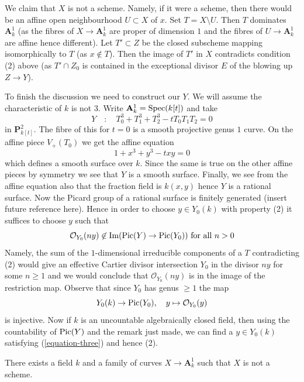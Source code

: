 \medskip\noindent
We claim that $X$ is not a scheme. Namely, if it were a scheme,
then there would be an affine open neighbourhood $U \subset X$ of $x$.
Set $T = X \setminus U$. Then $T$ dominates $\mathbf{A}^1_k$
(as the fibres of $X \to \mathbf{A}^1_k$ are proper of dimension $1$
and the fibres of $U \to \mathbf{A}^1_k$ are affine hence different).
Let $T' \subset Z$ be the closed subscheme mapping isomorphically
to $T$ (as $x \not \in T$). Then the image of $T'$ in $X$
contradicts condition (2) above (as $T' \cap Z_0$ is contained in
the exceptional divisor $E$ of the blowing up $Z \to Y$).

\medskip\noindent
To finish the discussion we need to construct our $Y$.
We will assume the characteristic of $k$ is not $3$.
Write $\mathbf{A}^1_k = \mathop{\mathrm{Spec}}(k[t])$ and take
$$
Y \quad : \quad T_0^3 + T_1^3 + T_2^3 - tT_0T_1T_2 = 0
$$
in $\mathbf{P}^2_{k[t]}$. The fibre of this for $t = 0$
is a smooth projective genus $1$ curve. On the affine piece
$V_+(T_0)$ we get the affine equation
$$
1 + x^3 + y^3 - txy = 0
$$
which defines a smooth surface over $k$. Since the same is true on the other
affine pieces by symmetry we see that $Y$ is a smooth surface.
Finally, we see from the affine equation also that the fraction
field is $k(x, y)$ hence $Y$ is a rational surface.
Now the Picard group of a rational surface is finitely generated
(insert future reference here).
Hence in order to choose $y \in Y_0(k)$ with property (2)
it suffices to choose $y$ such that
\begin{equation}
\label{equation-three}
\mathcal{O}_{Y_0}(ny) \not \in \mathop{\mathrm{Im}}(\mathop{\mathrm{Pic}}\nolimits(Y) \to \mathop{\mathrm{Pic}}\nolimits(Y_0))
\text{ for all }n > 0
\end{equation}
Namely, the sum of the $1$-dimensional irreducible components of a $T$
contradicting (2) would give an effective Cartier divisor intersection $Y_0$
in the divisor $ny$ for some $n \geq 1$ and we would conclude
that $\mathcal{O}_{Y_0}(ny)$ is in the image of the restriction map.
Observe that since $Y_0$ has genus $\geq 1$ the map
$$
Y_0(k) \to \mathop{\mathrm{Pic}}\nolimits(Y_0),\quad y \mapsto \mathcal{O}_{Y_0}(y)
$$
is injective. Now if $k$ is an uncountable algebraically closed field,
then using the countability of $\mathop{\mathrm{Pic}}\nolimits(Y)$ and the remark
just made, we can find a $y \in Y_0(k)$ satisfying (\ref{equation-three})
and hence (2).

\begin{lemma}
\label{lemma-family-of-curves-not-scheme}
There exists a field $k$ and a family of curves
$X \to \mathbf{A}^1_k$ such that $X$ is not a scheme.
\end{lemma}

